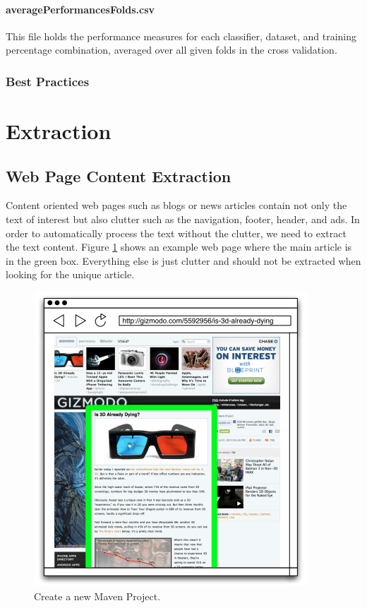 \documentclass[a4paper,twoside]{book}      %
\begin{document}
\paragraph{averagePerformancesFolds.csv} This file holds the performance measures for each classifier, dataset, and training percentage combination, averaged over all given folds in the cross validation.

\subsubsection{Best Practices}
\label{sec:bpTextClassification}


\section{Extraction}
\subsection{Web Page Content Extraction}
Content oriented web pages such as blogs or news articles contain not only the text of interest but also clutter such as the navigation, footer, header, and ads. In order to automatically process the text without the clutter, we need to extract the text content. Figure \ref{fig:webpagecontentextractor} shows an example web page where the main article is in the green box. Everything else is just clutter and should not be extracted when looking for the unique article.

\begin{figure}[ht!]
\includegraphics[width=\textwidth]{img/webpagecontentextractor.png}
\caption{Create a new Maven Project.}
\label{fig:webpagecontentextractor}
\end{figure}
\end{document}
